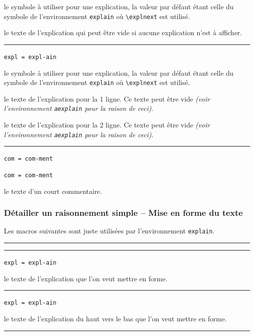 \documentclass[12pt,a4paper]{book}
\newcommand\env[1]{\texttt{#1}}
\newcommand\macro[1]{\env{\textbackslash{}#1}}
\theoremstyle{definition}
\newcommand\separation{
	\medskip
	\hfill\rule{0.5\textwidth}{0.75pt}\hfill
	\medskip
}
\newcommand\mwhyprefix[2]{%
	\texttt{#1 = #1-#2}%
}
\begin{document}
{{\IDoption{} le symbole à utiliser pour une explication, la valeur par défaut étant celle du symbole de l'environnement \env{explain} où \macro{explnext} est utilisé.

\IDarg{} le texte de l'explication qui peut être vide si aucune explication n'est à afficher.


\separation


 \hfill \mwhyprefix{expl}{ain}

\IDoption{} le symbole à utiliser pour une explication, la valeur par défaut étant celle du symbole de l'environnement \env{explain} où \macro{explnext} est utilisé.

 le texte de l'explication pour la 1\iere{} ligne.
          Ce texte peut être vide \emph{(voir l'environnement \env{aexplain} pour la raison de ceci)}.

 le texte de l'explication pour la 2\ieme{} ligne.
          Ce texte peut être vide \emph{(voir l'environnement \env{aexplain} pour la raison de ceci)}.


\separation


 \hfill \mwhyprefix{com}{ment}

 \hfill \mwhyprefix{com}{ment}


\IDarg{} le texte d'un court commentaire.




\subsubsection{Détailler un raisonnement simple -- Mise en forme du texte}

Les macros suivantes sont juste utilisées par l'environnement \env{explain}.


\separation




\separation


 \hfill \mwhyprefix{expl}{ain}

\IDarg{} le texte de l'explication que l'on veut mettre en forme.


\separation


 \hfill \mwhyprefix{expl}{ain}

\IDarg{} le texte de l'explication du haut vers le bas que l'on veut mettre en forme.


\separation


}}
\end{document}
